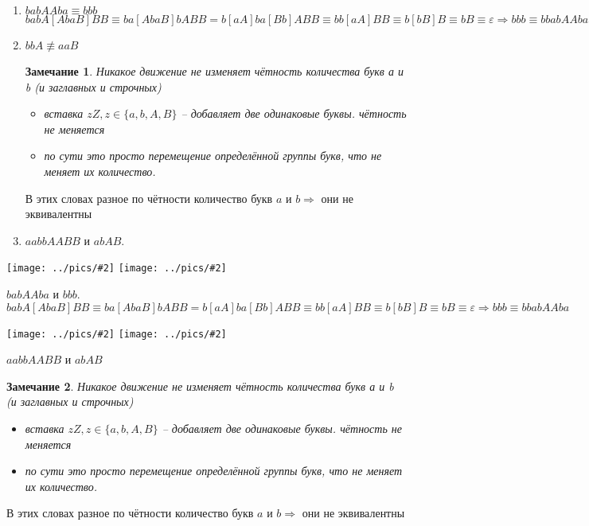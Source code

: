 \documentclass[12pt,a4paper, flushleft]{article}
\newtheorem{Zm}{Замечание}[section]
\newcommand{\gr}[2]{\texttt{[image: ../pics/\#2]}}
\begin{document}
\begin{enumerate}
	\item $babAAba\equiv bbb\qquad $ $babA[AbaB]BB\equiv ba[AbaB]bABB = b[aA]ba[Bb]ABB\equiv bb[aA]BB \equiv b[bB]B \equiv bB\equiv \varepsilon\Rightarrow bbb \equiv bbabAAba$
	\item $bbA\not \equiv aaB$
	\begin{Zm}
	Никакое движение не изменяет чётность количества букв а и b (и заглавных и строчных)
	\begin{itemize}
		\item вставка $zZ, z\in \{a, b, A, B\}$ -- добавляет две одинаковые буквы. чётность не меняется
		\item по сути это просто перемещение определённой группы букв, что не меняет их количество.
	\end{itemize}
	\end{Zm}
	В этих словах разное по чётности количество букв $a$ и $b\Rightarrow$ они не эквивалентны
	\item $aabbAABB$ и $abAB$.
	 
\end{enumerate}

\begin{multicols}{2}
\gr {0.25} {babAAba} \gr{0.25} {bbb}\columnbreak

$babAAba$ и $bbb$. 
$babA[AbaB]BB\equiv ba[AbaB]bABB = b[aA]ba[Bb]ABB\equiv bb[aA]BB \equiv b[bB]B \equiv bB\equiv \varepsilon\Rightarrow bbb \equiv bbabAAba$
\end{multicols}

\begin{multicols}{2}
\gr{0.25}{bbA} \gr {0.25} {aaB}\columnbreak

$aabbAABB$ и $abAB$
\begin{Zm}
	Никакое движение не изменяет чётность количества букв а и b (и заглавных и строчных)
	\begin{itemize}
		\item вставка $zZ, z\in \{a, b, A, B\}$ -- добавляет две одинаковые буквы. чётность не меняется
		\item по сути это просто перемещение определённой группы букв, что не меняет их количество.
	\end{itemize}
	\end{Zm}
	В этих словах разное по чётности количество букв $a$ и $b\Rightarrow$ они не эквивалентны
\end{multicols}
\end{document}
